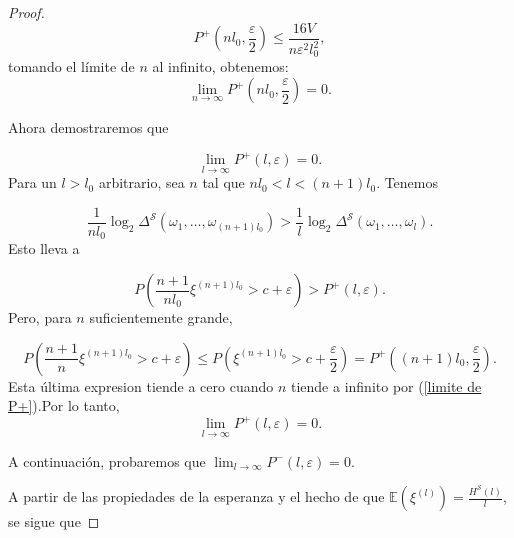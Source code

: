 \documentclass{report}
\begin{document}
\begin{proof}
    \[
    P^+\left(n l_0, \frac{\varepsilon}{2} \right) 
    \leq \frac{16V}{n \varepsilon^2 l_0^2},
    \]
    tomando el límite de $n$ al infinito, obtenemos:
    \begin{equation}\label{limite de P+}
        \lim_{n \to \infty} P^+\left(n l_0, \frac{\varepsilon}{2} \right) = 0.
    \end{equation}
\bigskip

    Ahora demostraremos que

    \[
    \lim_{l \to \infty} P^+(l, \varepsilon) = 0.
    \]
    Para un \( l > l_0 \) arbitrario, sea \( n \) tal que \( n l_0 < l < (n+1)l_0 \). Tenemos

    \[
    \frac{1}{n l_0} \log_2 \Delta^{\mathcal{S}}(\omega_1, \dots, \omega_{(n+1)l_0}) > \frac{1}{l} \log_2 \Delta^{\mathcal{S}}(\omega_1, \dots, \omega_l).
    \]
    Esto lleva a
    
    \[
    P\left( \frac{n+1}{n l_0} \xi^{(n+1)l_0} > c + \varepsilon \right) > P^+(l, \varepsilon).
    \]
    Pero, para \( n \) suficientemente grande,
    
    \[
    P\left( \frac{n+1}{n} \xi^{(n+1)l_0} > c + \varepsilon \right) 
    \leq P\left( \xi^{(n+1)l_0} > c + \frac{\varepsilon}{2} \right) 
    = P^+\left( (n+1)l_0, \frac{\varepsilon}{2} \right).
    \]
    Esta última expresion tiende a cero cuando $n$ tiende a infinito por (\ref{limite de P+}).Por lo tanto,
    \begin{equation}\label{eq 16}
    \lim_{l \to \infty} P^+(l, \varepsilon) = 0.
    \end{equation}
    \bigskip

    A continuación, probaremos que \( \lim_{l \to \infty} P^-(l, \varepsilon) = 0\).\newline
    
    A partir de las propiedades de la esperanza y el hecho de que \( \mathbb{E} (\xi^{(l)}) = \frac{H^{\mathcal{S}}(l)}{l} \), se sigue que


\end{proof}
\end{document}
